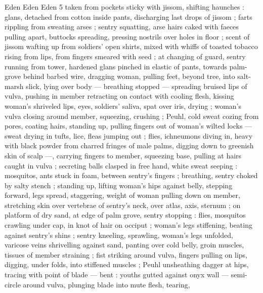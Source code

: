 Eden Eden Eden 5
taken from pockets sticky with jissom, shifting haunches : glans,
detached from cotton inside pants, discharging last drops of jissom
; farts rippling from sweating arses ; sentry squatting, arse hairs
caked with faeces pulling apart, buttocks spreading, pressing nostrils
over holes in floor ; scent of jissom wafting up from soldiers’ open
shirts, mixed with whiffs of toasted tobacco rising from lips, from
fingers smeared with seed ; at changing of guard, sentry running
from tower, hardened glans pinched in elastic of pants, towards
palm-grove behind barbed wire, dragging woman, pulling feet,
beyond tree, into salt-marsh slick, lying over body — breathing
stopped — spreading bruised lips of vulva, pushing in member
retracting on contact with cooling flesh, kissing woman's shriveled
lips, eyes, soldiers’ saliva, spat over iris, drying ; woman's vulva
closing around member, squeezing, crushing ; Peuhl, cold sweat
cozing from pores, coating hairs, standing up, pulling fingers out of
woman's wilted locks — sweat drying in tufts, lice, fleas jumping out
; flies, ichneumons diving in, heavy with black powder from charred
fringes of male palms, digging down to greenish skin of scalp —,
carrying fingers to member, squeezing base, pulling at hairs caught
in vulva ; secreting balls clasped in free hand, white sweat seeping :
mosquitos, ants stuck in foam, between sentry's fingers ; breathing,
sentry choked by salty stench ; standing up, lifting woman's hips
against belly, stepping forward, legs spread, staggering, weight of
woman pulling down on member, stretching skin over vertebrae of
sentry's neck, over atlas, axis, sternum ; on platform of dry sand, at
edge of palm grove, sentry stopping : flies, mosquitos crawling
under cap, in knot of hair on occiput ; woman's legs stiffening,
beating against sentry's shins ; sentry kneeling, sprawling, woman's
legs unfolded, varicose veins shrivelling against sand, panting over
cold belly, groin muscles, tissues of member straining ; fist striking
around vulva, fingers pulling on lips, digging, under folds, into
stiffened muscles ; Peuhl unsheathing dagger at hips, tracing with
point of blade — bent : youths gutted against onyx wall — semi-
circle around vulva, plunging blade into mute flesh, tearing,

